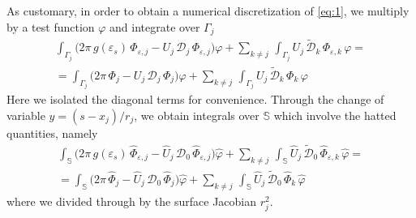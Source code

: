 \documentclass[aip,jcp,a4paper,11pt]{revtex4-1}
\begin{document}
As customary, in order to obtain a numerical discretization of \eqref{eq:1}, we multiply by a test function $\varphi$ and integrate over $\Gamma_j$
\begin{multline*}
\int_{\Gamma_j}\big( 2\pi \, g(\varepsilon_s) \, \Phi_{\varepsilon,j} - U_j \, {\mathcal{D}}_j \, \Phi_{\varepsilon,j} \big) \varphi +  \sum_{k \ne j} \, \int_{\Gamma_j} U_j \, \tilde{\mathcal{D}}_{k} \, \Phi_{\varepsilon,k} \, \varphi  = \\ 
= \int_{\Gamma_j}\big( 2 \pi \, {\Phi_j} - U_j \, {\mathcal{D}}_j \,\Phi_{j} \big) \varphi + \sum_{k \ne j} \,\int_{\Gamma_j } U_j \,  \tilde{\mathcal{D}}_{k} \, \Phi_{k}  \, \varphi
\end{multline*}
Here we isolated the diagonal terms for convenience.  Through the change of variable $y = (s- x_j)/r_j$, we obtain integrals over $\mathbb{S}$ which involve the hatted quantities, namely
\begin{multline}\label{eq:73}
 \int_{\mathbb{S}}\big( 2\pi \, g(\varepsilon_s) \, \hat{\Phi}_{\varepsilon,j} - \hat{U}_j \, {\mathcal{D}}_0 \, \hat{\Phi}_{\varepsilon,j} \big) \hat{\varphi} + \sum_{k \ne j} \,\int_{\mathbb{S}}  \hat{U}_j \, \tilde{\mathcal{D}}_0 \, \hat{\Phi}_{\varepsilon,k} \, \hat{\varphi}  = \\ 
= \int_{\mathbb{S}}\big( 2 \pi \, \hat{\Phi}_j - \hat{U}_j \, {\mathcal{D}}_0 \,\hat{\Phi}_j \big) \hat{\varphi} + \sum_{k \ne j} \, \int_{\mathbb{S}}  \hat{U}_j \, \tilde{\mathcal{D}}_0 \, \hat{\Phi}_{k}  \, \hat{\varphi}
\end{multline}
where we divided through by the surface Jacobian $r_j^2$.
\end{document}
